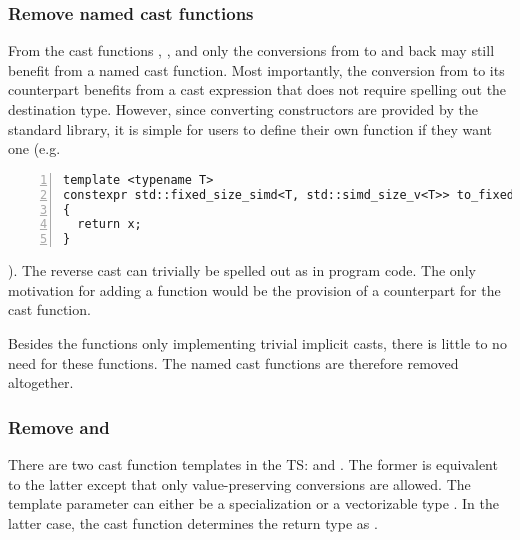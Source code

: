 \subsubsection{Remove named cast functions}

From the cast functions \stdx{}, \stdx{}, and
\stdx{} only the conversions from \simdabi{} to \simdabi{} and back may still benefit from a named cast
function.
Most importantly, the conversion from  to its 
counterpart benefits from a cast expression that does not require spelling out
the destination type.
However, since converting constructors are provided by the standard library, it
is simple for users to define their own  function if they
want one (e.g.
\begin{lstlisting}[numbers=left,float={hbtp},label=lst:userdefined-to-fixed-size,caption={
  Example of a user-defined \code{to_fixed_size} implementation if explicit casts are provided
}]
template <typename T>
constexpr std::fixed_size_simd<T, std::simd_size_v<T>> to_fixed_size(std::simd<T> x)
{
  return x;
}
\end{lstlisting}
).
The reverse cast can trivially be spelled out as 
in program code.
The only motivation for adding a  function would be the
provision of a counterpart for the  cast function.

Besides the functions only implementing trivial implicit casts, there is little
to no need for these functions.
The named cast functions are therefore removed altogether.

\subsubsection{Remove  and }
There are two cast function templates in the TS:  and
.
The former is equivalent to the latter except that only value-preserving
conversions are allowed.
The template parameter can either be a  specialization or a
vectorizable type .
In the latter case, the cast function determines the return type as
.

